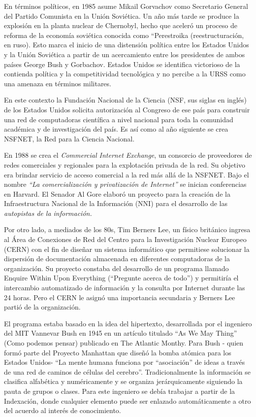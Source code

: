 \documentclass[
  letterpaper,
  DIV=11,
  numbers=noendperiod]{scrreprt}
\begin{document}
En términos políticos, en 1985 asume Mikail Gorvachov como Secretario
General del Partido Comunista en la Unión Soviética. Un año más tarde se
produce la explosión en la planta nuclear de Chernobyl, hecho que
aceleró un proceso de reforma de la economía soviética conocida como
``Perestroika (reestructuración, en ruso). Esto marca el inicio de una
distensión política entre los Estados Unidos y la Unión Soviética a
partir de un acercamiento entre los presidentes de ambos países George
Bush y Gorbachov. Estados Unidos se identifica victorioso de la
contienda política y la competitividad tecnológica y no percibe a la
URSS como una amenaza en términos militares.

En este contexto la Fundación Nacional de la Ciencia (NSF, sus siglas en
inglés) de los Estados Unidos solicita autorización al Congreso de ese
país para construir una red de computadoras científica a nivel nacional
para toda la comunidad académica y de investigación del país. Es así
como al año siguiente se crea NSFNET, la Red para la Ciencia Nacional.

En 1988 se crea el \emph{Commercial Internet Exchange}, un consorcio de
proveedores de redes comerciales y regionales para la explotación
privada de la red. Su objetivo era brindar servicio de acceso comercial
a la red más allá de la NSFNET. Bajo el nombre \emph{``La
comercialización y privatización de Internet''} se inician conferencias
en Harvard. El Senador Al Gore elaboró un proyecto para la creación de
la Infraestructura Nacional de la Información (NNI) para el desarrollo
de las \emph{autopistas de la información.}

Por otro lado, a mediados de los 80s, Tim Berners Lee, un físico
británico ingresa al Área de Conexiones de Red del Centro para la
Investigación Nuclear Europeo (CERN) con el fin de diseñar un sistema
informático que permitiese solucionar la dispersión de documentación
almacenada en diferentes computadoras de la organización. Su proyecto
constaba del desarrollo de un programa llamado Enquire Within Upon
Everything (``Pregunte acerca de todo'') y permitiría el intercambio
automatizado de información y la consulta por Internet durante las 24
horas. Pero el CERN le asignó una importancia secundaria y Berners Lee
partió de la organización.

El programa estaba basado en la idea del hipertexto, desarrollada por el
ingeniero del MIT Vannevar Bush en 1945 en un artículo titulado ``As We
May Thing'' (Como podemos pensar) publicado en The Atlantic Monthy. Para
Bush - quien formó parte del Proyecto Manhattan que diseñó la bomba
atómica para los Estados Unidos- ``La mente humana funciona por
``asociación'' de ideas a través de una red de caminos de células del
cerebro''. Tradicionalmente la información se clasifica alfabética y
numéricamente y se organiza jerárquicamente siguiendo la pauta de grupos
o clases. Para este ingeniero se debía trabajar a partir de la
Indexación, donde cualquier elemento puede ser enlazado automáticamente
a otro del acuerdo al interés de conocimiento.
\end{document}
